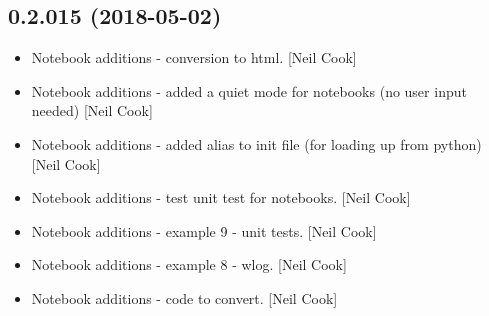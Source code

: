 \documentclass[a4paper,10pt,english]{report}
\begin{document}
\subsection{0.2.015 (2018-05-02)}
\label{\detokenize{misc/changelog:id446}}\begin{itemize}
\item {} 
Notebook additions - conversion to html. {[}Neil Cook{]}

\item {} 
Notebook additions - added a quiet mode for notebooks (no user input
needed) {[}Neil Cook{]}

\item {} 
Notebook additions - added  alias to init file (for loading
up from python) {[}Neil Cook{]}

\item {} 
Notebook additions - test unit test for notebooks. {[}Neil Cook{]}

\item {} 
Notebook additions - example 9 - unit tests. {[}Neil Cook{]}

\item {} 
Notebook additions - example 8 - wlog. {[}Neil Cook{]}

\item {} 
Notebook additions - code to convert. {[}Neil Cook{]}

\end{itemize}
\end{document}
